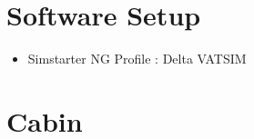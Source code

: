 
\def\mytitle{A2A C172}
\def\myauthor{}
\def\mydate{13 February 2018}


\chapter{Software Setup}
\label{softwaresetup}

\begin{itemize}
\item{} Simstarter NG Profile : Delta VATSIM

\end{itemize}

\chapter{Cabin}
\label{cabin}

